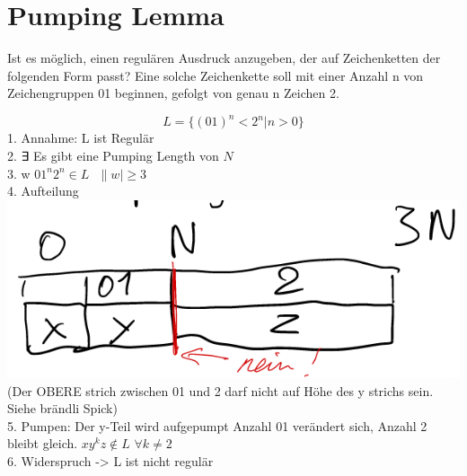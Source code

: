 \section{Pumping Lemma}
Ist es möglich, einen regulären Ausdruck anzugeben, der auf Zeichenketten der folgenden Form passt? Eine solche Zeichenkette soll mit einer Anzahl n von Zeichengruppen 01 beginnen, gefolgt von genau n Zeichen 2.

$$L=\{(01)^n <2^n | n > 0\}$$
1. Annahme: L ist Regulär \\
2. ∃ Es gibt eine Pumping Length von $N$ \\
3. w $01^n 2^n \in L \ \ \ \|w| ≥ 3 $ \\
4. Aufteilung \\
\includegraphics[width=\columnwidth]{img/pumpinglemma.png} \\
(Der OBERE strich zwischen 01 und 2 darf nicht auf Höhe des y strichs sein. Siehe brändli Spick) \\
5. Pumpen: Der y-Teil wird aufgepumpt Anzahl 01 verändert sich, Anzahl 2 bleibt gleich. $xy^k z \notin L$ $∀ k ≠ 2$ \\
6. Widerspruch -> L ist nicht regulär

